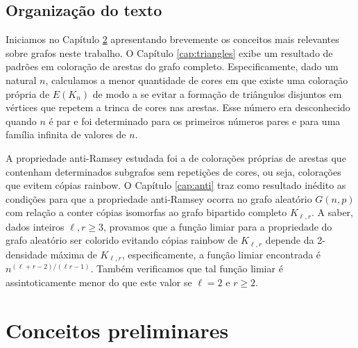 \documentclass[12pt,a4paper]{book}
\newcommand{\K}{K_{\ell,r}} %
\begin{document}
\section{Organização do texto}

Iniciamos no Capítulo \ref{cap:prelim} apresentando brevemente os conceitos mais relevantes sobre grafos neste trabalho.
O Capítulo \ref{cap:triangles} exibe um resultado de padrões em coloração de arestas do grafo completo. 
Especificamente, dado um natural $n$, calculamos a menor 
quantidade de cores em que existe uma coloração própria de $E(K_n)$ de modo a se evitar a formação de triângulos disjuntos em vértices que repetem a trinca de cores nas arestas.
Esse número era desconhecido quando $n$ é par e foi determinado para os primeiros números pares e para uma família infinita de valores de $n$.


A propriedade anti-Ramsey estudada foi a de colorações próprias de arestas que contenham determinados subgrafos sem repetições de cores, ou seja, colorações que evitem cópias rainbow. 
 O Capítulo \ref{cap:anti} traz como resultado inédito as condições para que a propriedade anti-Ramsey ocorra no grafo aleatório $G(n,p)$ com relação a conter cópias isomorfas ao grafo bipartido completo $\K$. 
A saber, dados inteiros $\ell,r \geq 3$, provamos que a função limiar para a propriedade do grafo aleatório ser colorido evitando cópias rainbow de $\K$ depende da 2-densidade máxima de $\K$, especificamente, a função limiar encontrada é 
$n^{(\ell+r-2)/(\ell r-1)}$.
Também verificamos que tal função limiar é assintoticamente menor do que este valor se $\ell=2$ e $r\geq 2$.


\chapter[Conceitos preliminares]{Conceitos preliminares}
\label{cap:prelim}
\end{document}
